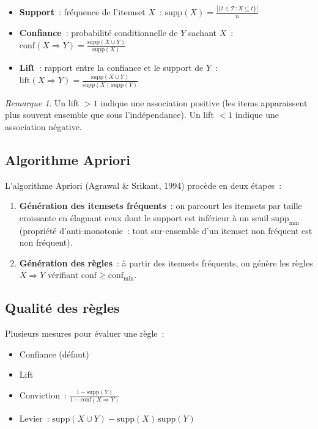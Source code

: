 \documentclass[a4paper,11pt]{article}
\theoremstyle{definition}
\theoremstyle{remark}
\newtheorem*{remark}{Remarque}
\begin{document}
\begin{itemize}
  \item \textbf{Support}~: fr\'equence de l'itemset $X$~:
    $\displaystyle \text{supp}(X) = \frac{|\{t \in \mathcal{T} : X \subseteq t\}|}{n}$
  \item \textbf{Confiance}~: probabilit\'e conditionnelle de $Y$
    sachant $X$~:
    $\displaystyle \text{conf}(X \Rightarrow Y) = \frac{\text{supp}(X \cup Y)}{\text{supp}(X)}$
  \item \textbf{Lift}~: rapport entre la confiance et le support de $Y$~:
    $\displaystyle \text{lift}(X \Rightarrow Y) = \frac{\text{supp}(X \cup Y)}{\text{supp}(X)\,\text{supp}(Y)}$
\end{itemize}

\begin{remark}
  Un lift $> 1$ indique une association positive (les items
  apparaissent plus souvent ensemble que sous l'ind\'ependance).
  Un lift $< 1$ indique une association n\'egative.
\end{remark}

\subsection{Algorithme Apriori}

L'algorithme Apriori (Agrawal \& Srikant, 1994) proc\`ede en deux
\'etapes~:

\begin{enumerate}
  \item \textbf{G\'en\'eration des itemsets fr\'equents}~: on
    parcourt les itemsets par taille croissante en \'elaguant ceux
    dont le support est inf\'erieur \`a un seuil $\text{supp}_{\min}$
    (propri\'et\'e d'anti-monotonie~: tout sur-ensemble d'un itemset
    non fr\'equent est non fr\'equent).
  \item \textbf{G\'en\'eration des r\`egles}~: \`a partir des
    itemsets fr\'equents, on g\'en\`ere les r\`egles $X \Rightarrow Y$
    v\'erifiant $\text{conf} \geq \text{conf}_{\min}$.
\end{enumerate}

\subsection{Qualit\'e des r\`egles}

Plusieurs mesures pour \'evaluer une r\`egle~:
\begin{itemize}
  \item Confiance (d\'efaut)
  \item Lift
  \item Conviction~: $\displaystyle \frac{1 - \text{supp}(Y)}{1 - \text{conf}(X \Rightarrow Y)}$
  \item Levier~: $\text{supp}(X \cup Y) - \text{supp}(X)\,\text{supp}(Y)$
\end{itemize}
\end{document}
